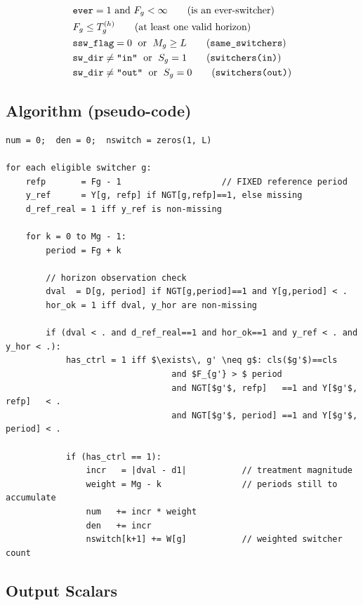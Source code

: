 \documentclass[11pt]{article}
\begin{document}
\begin{align}
  & \texttt{ever} = 1 \text{ and } F_g < \infty \tag{is an ever-switcher}\\
  & F_g \leq T_g^{(h)} \tag{at least one valid horizon} \\
  & \texttt{ssw\_flag} = 0 \;\text{ or }\; M_g \geq L \tag{\texttt{same\_switchers}} \\
  & \texttt{sw\_dir} \neq \texttt{"in"} \;\text{ or }\; S_g = 1 \tag{\texttt{switchers(in)}} \\
  & \texttt{sw\_dir} \neq \texttt{"out"} \;\text{ or }\; S_g = 0 \tag{\texttt{switchers(out)}}
\end{align}

\subsection{Algorithm (pseudo-code)}

\begin{lstlisting}[mathescape=true, language={}]
num = 0;  den = 0;  nswitch = zeros(1, L)

for each eligible switcher g:
    refp       = Fg - 1                    // FIXED reference period
    y_ref      = Y[g, refp] if NGT[g,refp]==1, else missing
    d_ref_real = 1 iff y_ref is non-missing

    for k = 0 to Mg - 1:
        period = Fg + k

        // horizon observation check
        dval  = D[g, period] if NGT[g,period]==1 and Y[g,period] < .
        hor_ok = 1 iff dval, y_hor are non-missing

        if (dval < . and d_ref_real==1 and hor_ok==1 and y_ref < . and y_hor < .):
            has_ctrl = 1 iff $\exists\, g' \neq g$: cls($g'$)==cls
                                 and $F_{g'} > $ period
                                 and NGT[$g'$, refp]   ==1 and Y[$g'$, refp]   < .
                                 and NGT[$g'$, period] ==1 and Y[$g'$, period] < .

            if (has_ctrl == 1):
                incr   = |dval - d1|           // treatment magnitude
                weight = Mg - k                // periods still to accumulate
                num   += incr * weight
                den   += incr
                nswitch[k+1] += W[g]           // weighted switcher count
\end{lstlisting}

\subsection{Output Scalars}
\end{document}
